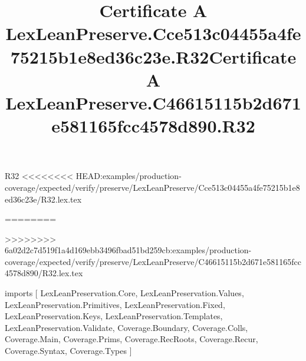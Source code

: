\begin{lexlean}{R32}
<<<<<<<< HEAD:examples/production-coverage/expected/verify/preserve/LexLeanPreserve/Cce513c04455a4fe75215b1e8ed36c23e/R32.lex.tex
\title{Certificate A LexLeanPreserve.Cce513c04455a4fe75215b1e8ed36c23e.R32}
========
\title{Certificate A LexLeanPreserve.C46615115b2d671e581165fcc4578d890.R32}
>>>>>>>> 6a02d2c7d519f1a4d169ebb3496fbad51bd259cb:examples/production-coverage/expected/verify/preserve/LexLeanPreserve/C46615115b2d671e581165fcc4578d890/R32.lex.tex
\begin{coremodule}
imports [
  LexLeanPreservation.Core,
  LexLeanPreservation.Values,
  LexLeanPreservation.Primitives,
  LexLeanPreservation.Fixed,
  LexLeanPreservation.Keys,
  LexLeanPreservation.Templates,
  LexLeanPreservation.Validate,
  Coverage.Boundary,
  Coverage.Colls,
  Coverage.Main,
  Coverage.Prims,
  Coverage.RecRoots,
  Coverage.Recur,
  Coverage.Syntax,
  Coverage.Types
]


\end{coremodule}
\end{lexlean}
